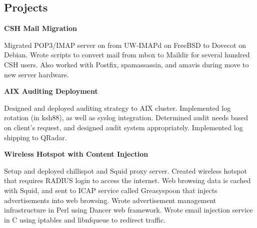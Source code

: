 \documentclass[letter,margin,line]{resume}
\begin{document}
\begin{resume}
\section{\mysidestyle Projects}
	\begin{asparablank}
		\item {\bf CSH Mail Migration}
		
		\small Migrated POP3/IMAP server on from UW-IMAPd on FreeBSD to Dovecot on Debian. Wrote scripts to convert mail from mbox to Maildir for several hundred CSH users. Also worked with Postfix, spamassassin, and amavis during move to new server hardware.
		\normalsize
		\\
		
		\item {\bf AIX Auditing Deployment}
		
		\small Designed and deployed auditing strategy to AIX cluster.
		Implemented log rotation (in ksh88), as well as syslog
		integration. Determined audit needs based on client's request,
		and designed audit system appropriately. Implemented log
		shipping to QRadar.
		\normalsize
		\\
		
		\item {\bf Wireless Hotspot with Content Injection}
		
		\small Setup and deployed chillispot and Squid proxy server.
        Created wireless hotspot that requires RADIUS login to access the
        internet. Web browsing data is cached with Squid, and sent to ICAP
        service called Greasyspoon that injects advertisements into web
        browsing. Wrote advertisement management infrastructure in Perl using
        Dancer web framework. Wrote email injection service in C using iptables
        and libnfqueue to redirect traffic.
		\normalsize
		\\
	\end{asparablank}	
\end{resume}
\end{document}
